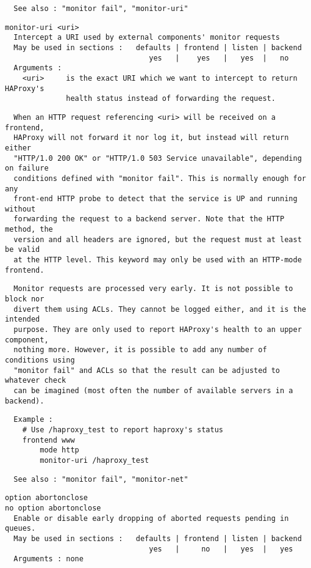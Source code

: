 \begin{verbatim}
  See also : "monitor fail", "monitor-uri"
\end{verbatim}

\begin{verbatim}
monitor-uri <uri>
  Intercept a URI used by external components' monitor requests
  May be used in sections :   defaults | frontend | listen | backend
                                 yes   |    yes   |   yes  |   no
  Arguments :
    <uri>     is the exact URI which we want to intercept to return HAProxy's
              health status instead of forwarding the request.
\end{verbatim}

\begin{verbatim}
  When an HTTP request referencing <uri> will be received on a frontend,
  HAProxy will not forward it nor log it, but instead will return either
  "HTTP/1.0 200 OK" or "HTTP/1.0 503 Service unavailable", depending on failure
  conditions defined with "monitor fail". This is normally enough for any
  front-end HTTP probe to detect that the service is UP and running without
  forwarding the request to a backend server. Note that the HTTP method, the
  version and all headers are ignored, but the request must at least be valid
  at the HTTP level. This keyword may only be used with an HTTP-mode frontend.
\end{verbatim}

\begin{verbatim}
  Monitor requests are processed very early. It is not possible to block nor
  divert them using ACLs. They cannot be logged either, and it is the intended
  purpose. They are only used to report HAProxy's health to an upper component,
  nothing more. However, it is possible to add any number of conditions using
  "monitor fail" and ACLs so that the result can be adjusted to whatever check
  can be imagined (most often the number of available servers in a backend).
\end{verbatim}

\begin{verbatim}
  Example :
    # Use /haproxy_test to report haproxy's status
    frontend www
        mode http
        monitor-uri /haproxy_test
\end{verbatim}

\begin{verbatim}
  See also : "monitor fail", "monitor-net"
\end{verbatim}

\begin{verbatim}
option abortonclose
no option abortonclose
  Enable or disable early dropping of aborted requests pending in queues.
  May be used in sections :   defaults | frontend | listen | backend
                                 yes   |     no   |   yes  |   yes
  Arguments : none
\end{verbatim}

